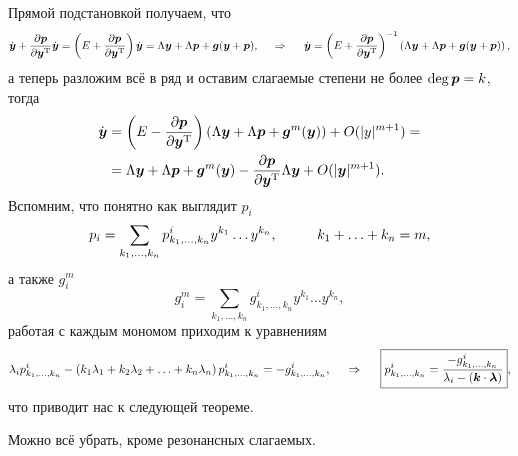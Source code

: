 Прямой подстановкой получаем, что
\begin{equation*}
    \dot{\mbox{\boldmath $y$}} + \frac{\partial \mbox{\boldmath $p$}}{\partial \mbox{\boldmath $y$}^{\text{T}}} \dot{\mbox{\boldmath $y$}} = 
    \left(E + \frac{\partial \mbox{\boldmath $p$}}{\partial \mbox{\boldmath $y$}^{\text{T}}}\right) \dot{\mbox{\boldmath $y$}} = 
    \Lambda \mbox{\boldmath $y$} + \Lambda \mbox{\boldmath $p$} + \mbox{\boldmath $g$}(\mbox{\boldmath $y$} + \mbox{\boldmath $p$}),
    \hspace{0.5cm} \Rightarrow \hspace{0.5cm}
    \dot{\mbox{\boldmath $y$}} = 
    \left(E + \frac{\partial \mbox{\boldmath $p$}}{\partial \mbox{\boldmath $y$}^{\text{T}}}\right)^{-1} \left(
        \Lambda \mbox{\boldmath $y$} + \Lambda \mbox{\boldmath $p$} + \mbox{\boldmath $g$}(\mbox{\boldmath $y$} + \mbox{\boldmath $p$})
    \right),
\end{equation*}
а теперь разложим всё в ряд и оставим слагаемые степени не более $\deg \mbox{\boldmath $p$} = k$, тогда
\begin{align*}
    \dot{\mbox{\boldmath $y$}} &=
     \left(E - \frac{\partial \mbox{\boldmath $p$}}{\partial \mbox{\boldmath $y$}^{\text{T}}}\right)
     \left(
        \Lambda \mbox{\boldmath $y$} + \Lambda \mbox{\boldmath $p$} + \mbox{\boldmath $g$}^m (\mbox{\boldmath $y$})
     \right) + O(|y|^{m+1}) = \\
     &= \Lambda \mbox{\boldmath $y$} + \Lambda \mbox{\boldmath $p$} + \mbox{\boldmath $g$}^m (\mbox{\boldmath $y$}) - \frac{\partial \mbox{\boldmath $p$}}{\partial \mbox{\boldmath $y$}^{\text{T}}} \Lambda \mbox{\boldmath $y$} + O(|\mbox{\boldmath $y$}|^{m+1}).
\end{align*}
Вспомним, что понятно как выглядит $p_i$
\begin{equation*}
    p_i = \sum_{k_1, \ldots, k_n} p^i_{k_1, ..., k_n} y^{k_1} \ldots y^{k_n},
    \hspace{1 cm}
    k_1 + \ldots + k_n = m,
\end{equation*}
а также $g_i^m$
\begin{equation*}
    g_{i}^m = \sum_{k_1, \ldots, k_n} g^i_{k_1, \ldots, k_n} y^{k_1} \ldots y^{k_n},
\end{equation*}
работая с каждым мономом приходим к уравнениям
\begin{equation*}
    \lambda_i p^i_{k_1, \ldots, k_n} - \left(
        k_1 \lambda_1 + k_2 \lambda_2 + \ldots + k_n \lambda_n
    \right) p^i_{k_1, \ldots, k_n} = -g^i_{k_1, \ldots, k_n},
    \hspace{0.5cm} \Rightarrow \hspace{0.5cm}
    \boxed{
    p_{k_1, \ldots, k_n}^i = 
    \frac{-g^i_{k_1, \ldots, k_n}}{\lambda_i - (\mbox{\boldmath $k$} \cdot \mbox{\boldmath $\lambda$})} 
    },
\end{equation*}
что приводит нас к следующей теореме.

\begin{to_thr}
    Можно всё убрать, кроме резонансных слагаемых.
\end{to_thr}









